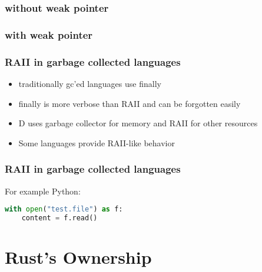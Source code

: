 \documentclass[xcolor=colortbl
]{beamer}
\begin{document}
\begin{frame}
    \frametitle{without weak pointer}
\end{frame}


\begin{frame}
    \frametitle{with weak pointer}
\end{frame}

\begin{frame}
    \frametitle{RAII in garbage collected languages}
    \begin{itemize}
        \item traditionally gc'ed languages use finally
        \item finally is more verbose than RAII and can be forgotten easily
        \item D uses garbage collector for memory and RAII for other resources
        \item Some languages provide RAII-like behavior
    \end{itemize}
\end{frame}


\begin{frame}[fragile]
    \frametitle{RAII in garbage collected languages}
    For example Python:
    \begin{lstlisting}[language=python,frame=single]
with open("test.file") as f:
    content = f.read()
    \end{lstlisting}
\end{frame}

\section{Rust's Ownership}
\end{document}
